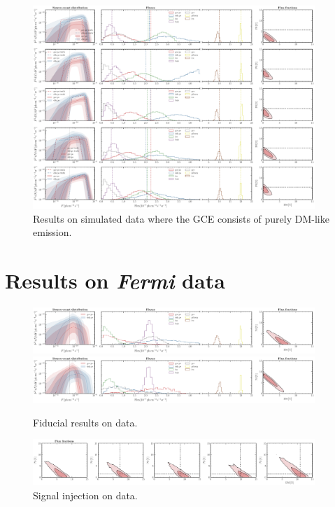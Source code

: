 \documentclass[prd,aps,10pt,nofootinbib,twocolumn,superscriptaddress,preprintnumbers,balancelastpage,longbibliography]{revtex4-1}
\begin{document}
%
\begin{figure}
    \centering
    \includegraphics[width=0.95\textwidth]{plots/sim_sbi_ps.pdf}
    \caption{Results on simulated data where the GCE consists of purely DM-like emission.}
    \label{fig:sim_sbi_ps}
\end{figure}
%

\section{Results on \emph{Fermi} data}
\label{sec:data}

%
\begin{figure}
    \centering
    \includegraphics[width=0.95\textwidth]{plots/data_fid_sbi.pdf}
    \includegraphics[width=0.95\textwidth]{plots/data_fid_nptf.pdf}
    \caption{Fiducial results on data.}
    \label{fig:fid_data}
\end{figure}
%

%
\begin{figure}
    \centering
    \includegraphics[width=0.95\textwidth]{plots/data_sig_inj.pdf}
    \caption{Signal injection on data.}
    \label{fig:sig_inj_data}
\end{figure}
%
\end{document}
